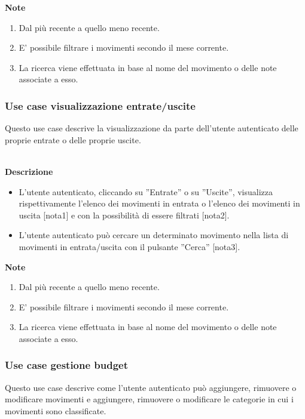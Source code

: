 \documentclass[a4paper,12pt]{article}
\begin{document}
\textbf{Note}
\begin{enumerate} \setlength\itemsep{0.01em}
\item Dal più recente a quello meno recente.
\item E' possibile filtrare i movimenti secondo il mese corrente.
\item La ricerca viene effettuata in base al nome del movimento o delle note associate a esso.
\end{enumerate}



\subsubsection*{Use case visualizzazione entrate/uscite}

Questo use case descrive la visualizzazione da parte dell'utente autenticato delle proprie entrate o delle proprie uscite.

\textbf{\\Descrizione}
\begin{itemize} \setlength\itemsep{0.01em}
\item L'utente autenticato, cliccando su ''Entrate'' o su ''Uscite'', visualizza rispettivamente l'elenco dei movimenti in entrata o l'elenco dei movimenti in uscita [nota1] e con la possibilità di essere filtrati [nota2].
\item L'utente autenticato può cercare un determinato movimento nella lista di movimenti in entrata/uscita con il pulsante ''Cerca'' [nota3].
\end{itemize}

\textbf{Note}
\begin{enumerate} \setlength\itemsep{0.01em}
\item Dal più recente a quello meno recente.
\item E' possibile filtrare i movimenti secondo il mese corrente.
\item La ricerca viene effettuata in base al nome del movimento o delle note associate a esso.
\end{enumerate}




\subsubsection*{Use case gestione budget}

Questo use case descrive come l'utente autenticato può aggiungere, rimuovere o modificare movimenti e aggiungere, rimuovere o modificare le categorie in cui i movimenti sono classificate.
\end{document}
